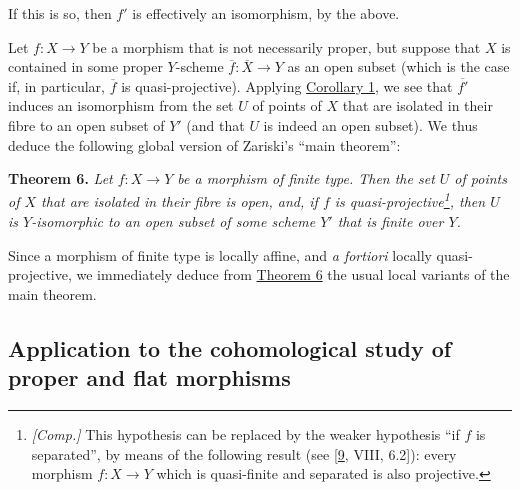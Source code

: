\documentclass{article}
\newenvironment{itenv}[1]
  {\phantomsection\par\smallskip\noindent\textbf{#1.}\itshape}
  {\par\smallskip}
\theoremstyle{definition}
\theoremstyle{definition}
\theoremstyle{definition}
\theoremstyle{definition}
\theoremstyle{remark}
\begin{document}
If this is so, then \(f'\) is effectively an isomorphism, by the above.

Let \(f\colon X\to Y\) be a morphism that is not necessarily proper, but suppose that \(X\) is contained in some proper \(Y\)-scheme \(\overline{f}\colon\overline{X}\to Y\) as an open subset (which is the case if, in particular, \(\overline{f}\) is quasi-projective).
Applying \protect\hyperlink{fga-2-theorem-5-corollary-1}{Corollary 1}, we see that \(\overline{f'}\) induces an isomorphism from the set \(U\) of points of \(X\) that are isolated in their fibre to an open subset of \(Y'\) (and that \(U\) is indeed an open subset).
We thus deduce the following global version of Zariski's ``main theorem'':

\leavevmode{}%
\begin{itenv}{Theorem 6}
Let \(f\colon X\to Y\) be a morphism of finite type.
Then the set \(U\) of points of \(X\) that are isolated in their fibre is open, and, if \(f\) is quasi-projective\footnote{\emph{{[}Comp.{]}} This hypothesis can be replaced by the weaker hypothesis ``if \(f\) is separated'', by means of the following result (see {[}\protect\hyperlink{ref-Gro1960b}{9}, VIII, 6.2{]}): every morphism \(f\colon X\to Y\) which is quasi-finite and separated is also projective.}, then \(U\) is \(Y\)-isomorphic to an open subset of some scheme \(Y'\) that is finite over \(Y\).

\end{itenv}

Since a morphism of finite type is locally affine, and \emph{a fortiori} locally quasi-projective, we immediately deduce from \protect\hyperlink{fga-2-theorem-6}{Theorem 6} the usual local variants of the main theorem.

\hypertarget{fga-2-section-5}{%
\subsection{Application to the cohomological study of proper and flat morphisms}\label{fga-2-section-5}}
\end{document}
